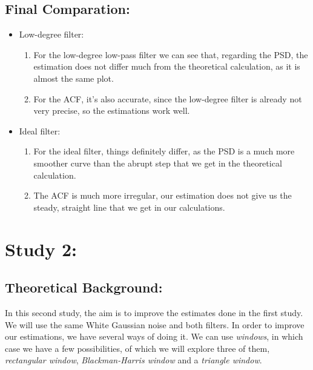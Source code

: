 \documentclass[a4paper,11pt]{article}
\begin{document}
\newpage

\subsection{Final Comparation:}

\begin{itemize}

\item Low-degree filter:

\begin{enumerate}

\item For the low-degree low-pass filter we can see that, regarding the PSD, the estimation does not differ much from the theoretical calculation, as it is almost the same plot.
\item For the ACF, it's also accurate, since the low-degree filter is already not very precise, so the estimations work well.

\end{enumerate}

\item Ideal filter:

\begin{enumerate}

\item For the ideal filter, things definitely differ, as the PSD is a much more smoother curve than the abrupt step that we get in the theoretical calculation.
\item The ACF is much more irregular, our estimation does not give us the steady, straight line that we get in our calculations.

\end{enumerate}

\end{itemize}

\newpage

\section{Study 2:}

\subsection{Theoretical Background:}

In this second study, the aim is to improve the estimates done in the first study. We will use the same White Gaussian noise and both filters. In order to improve our estimations, we have several ways of doing it. We can use \textit{windows}, in which case we have a few possibilities, of which we will explore three of them, \textit{rectangular window}, \textit{Blackman-Harris window} and a \textit{triangle window}.
\end{document}
